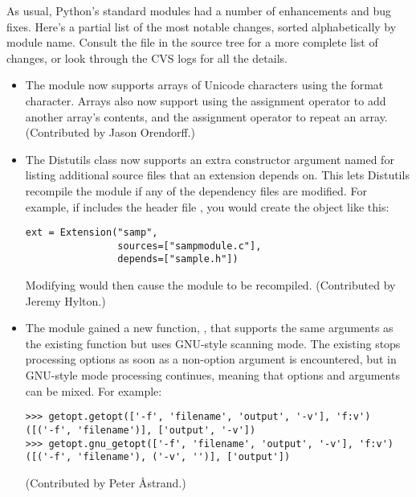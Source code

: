 \documentclass{howto}
\begin{document}
As usual, Python's standard modules had a number of enhancements and
bug fixes.  Here's a partial list of the most notable changes, sorted
alphabetically by module name. Consult the
 file in the source tree for a more
complete list of changes, or look through the CVS logs for all the
details.

\begin{itemize}

\item The  module now supports arrays of Unicode
characters using the  format character.  Arrays also now
support using the \code{+=} assignment operator to add another array's
contents, and the \code{*=} assignment operator to repeat an array.
(Contributed by Jason Orendorff.)

\item The Distutils  class now supports 
an extra constructor argument named  for listing
additional source files that an extension depends on.  This lets
Distutils recompile the module if any of the dependency files are
modified.  For example, if  includes the header
file , you would create the  object like
this:

\begin{verbatim}
ext = Extension("samp",
                sources=["sampmodule.c"],
                depends=["sample.h"])
\end{verbatim}

Modifying  would then cause the module to be recompiled.
(Contributed by Jeremy Hylton.)

\item The  module gained a new function,
, that supports the same arguments as the existing
 function but uses GNU-style scanning mode. 
The existing  stops processing options as soon as a
non-option argument is encountered, but in GNU-style mode processing
continues, meaning that options and arguments can be mixed.  For
example:

\begin{verbatim}
>>> getopt.getopt(['-f', 'filename', 'output', '-v'], 'f:v')
([('-f', 'filename')], ['output', '-v'])
>>> getopt.gnu_getopt(['-f', 'filename', 'output', '-v'], 'f:v')
([('-f', 'filename'), ('-v', '')], ['output'])
\end{verbatim}

(Contributed by Peter \AA{strand}.)


\end{itemize}
\end{document}
